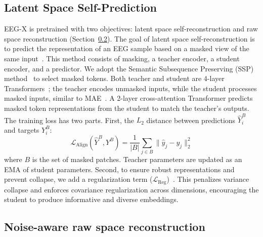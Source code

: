 \documentclass{article} %
\begin{document}
\subsection{Latent Space Self-Prediction} \label{sec:latent-space}
EEG-X is pretrained with two objectives: latent space self-reconstruction and raw space reconstruction (Section~\ref{sec:ica_reconstruction}). The goal of latent space self-reconstruction is to predict the representation of an EEG sample based on a masked view of the same input~\citep{data2vec2022,data2vec2-2023,i-jepa23,eeg2rep}. This method consists of masking, a teacher encoder, a student encoder, and a predictor. We adopt the Semantic Subsequence Preserving (SSP) method~\citep{eeg2rep} to select masked tokens. Both teacher and student are 4-layer Transformers~\citep{attention2017,bert2018}; the teacher encodes unmasked inputs, while the student processes masked inputs, similar to MAE~\citep{mae2022}. A 2-layer cross-attention Transformer predicts masked token representations from the student to match the teacher’s outputs. The training loss has two parts. First, the $L_2$ distance between predictions $\hat{Y}^B_i$ and targets $Y^B_i$:
\begin{equation}\label{eq:L2}
\text{$\mathcal{L}_{\text{Align}} (\hat{Y}^B, Y^B)$} = \frac{1}{|B|}\sum_{j \in B} \|\hat{y}_j - y_j \|_2^2
\end{equation}
where $B$ is the set of masked patches. Teacher parameters are updated as an EMA of student parameters.
Second, to ensure robust representations and prevent collapse, we add a regularization term ($\mathcal{L}_{\text{Reg}}$)~\citep{vicreg2022}. This penalizes variance collapse and enforces covariance regularization across dimensions, encouraging the student to produce informative and diverse embeddings.

\subsection{Noise-aware raw space reconstruction} \label{sec:ica_reconstruction}
\end{document}
